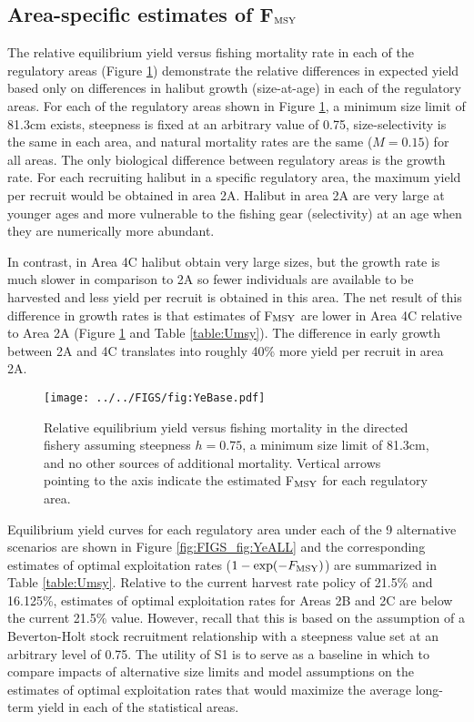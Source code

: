 \subsection*{Area-specific estimates of F$_{\rm{MSY}}$} %
\label{sub:area_specific_estimates_of_FMSY}

The relative equilibrium yield versus fishing mortality rate in each of the regulatory areas  (Figure \ref{fig:FIGS_fig:YeBase}) demonstrate the relative differences in expected yield based only on differences in halibut growth (size-at-age) in each of the regulatory areas.  For each of the regulatory areas shown in Figure \ref{fig:FIGS_fig:YeBase}, a minimum size limit of 81.3cm exists, steepness is fixed at an arbitrary value of 0.75, size-selectivity is the same in each area, and natural mortality rates are the same ($M=0.15$) for all areas.  The only biological difference between regulatory areas is the growth rate.  For each recruiting halibut in a specific regulatory area, the maximum yield per recruit would be obtained in area 2A.  Halibut in area 2A are very large at younger ages and more vulnerable to the fishing gear (selectivity) at an age when they are numerically more abundant.

In contrast, in Area 4C halibut obtain very large sizes, but the growth rate is much slower in comparison to 2A so fewer individuals are available to be harvested and less yield per recruit is obtained in this area.  The net result of this difference in growth rates is that estimates of F$_{\rm{MSY}}$ are lower in Area 4C relative to Area 2A (Figure \ref{fig:FIGS_fig:YeBase} and Table \ref{table:Umsy}).  The difference in early growth between 2A and 4C translates into roughly 40\% more yield per recruit in area 2A.


\begin{figure}[htbp]
	\centering
		\texttt{[image: ../../FIGS/fig:YeBase.pdf]}
	\caption{Relative equilibrium yield versus fishing mortality in the directed fishery assuming steepness $h=0.75$, a minimum size limit of 81.3cm, and no other sources of additional mortality. Vertical arrows pointing to the axis indicate the estimated F$_{\rm{MSY}}$ for each regulatory area.}
	\label{fig:FIGS_fig:YeBase}
\end{figure}

Equilibrium yield curves for each regulatory area under each of the 9 alternative scenarios are shown in Figure \ref{fig:FIGS_fig:YeALL} and the corresponding estimates of optimal exploitation rates ($1-\exp(-F_{\rm{MSY}})$) are summarized in Table \ref{table:Umsy}.  Relative to the current harvest rate policy of 21.5\% and 16.125\%, estimates of optimal exploitation rates for Areas 2B and 2C are below the current 21.5\% value.   However, recall that this is based on the assumption of a Beverton-Holt stock recruitment relationship with a steepness value set at an arbitrary level of 0.75.  The utility of S1 is to serve as a baseline in which to compare impacts of alternative size limits and model assumptions on the estimates of optimal exploitation rates that would maximize the average long-term yield in each of the statistical areas.


